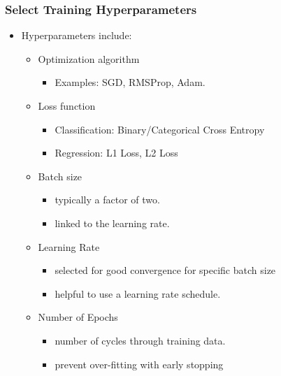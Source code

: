 \documentclass{beamer}
\begin{document}
\begin{frame}
    \frametitle{Select Training Hyperparameters}

    \begin{itemize}
        \item Hyperparameters include:
        \begin{itemize}
            \item Optimization algorithm
            \begin{itemize}
                \item Examples: SGD, RMSProp, Adam.
            \end{itemize}
            \item Loss function
            \begin{itemize}
                \item Classification: Binary/Categorical Cross Entropy
                \item Regression: L1 Loss, L2 Loss
            \end{itemize}
            \item Batch size
            \begin{itemize}
                \item typically a factor of two.
                \item linked to the learning rate.
            \end{itemize}
            \item Learning Rate
            \begin{itemize}
                \item selected for good convergence for specific batch size
                \item helpful to use a learning rate schedule.
            \end{itemize}
            \item Number of Epochs
            \begin{itemize}
                \item number of cycles through training data.
                \item prevent over-fitting with early stopping
            \end{itemize}

        \end{itemize}

    \end{itemize}

    
\end{frame}
\end{document}
